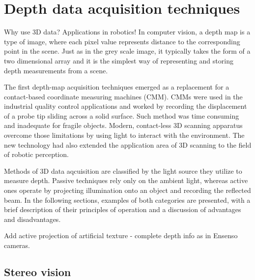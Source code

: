 \chapter{Depth data acquisition techniques}
\label{cha:acquisition}

Why use 3D data? Applications in robotics!
In computer vision, a depth map is a type of image, where each pixel value represents distance to the corresponding point in the scene. Just as in the grey scale image, it typically takes the form of a two dimensional array and it is the simplest way of representing and storing depth measurements from a scene.

The first depth-map acquisition techniques emerged as a replacement for a contact-based coordinate measuring machines (CMM). CMMs were used in the industrial quality control applications and worked by recording the displacement of a probe tip sliding across a solid surface. Such method was time consuming and inadequate for fragile objects. Modern, contact-less 3D scanning apparatus overcome those limitations by using light to interact with the environment. The new technology had also extended the application area of 3D scanning to the field of robotic perception.

Methods of 3D data aqcuisition are classified by the light source they utilize to measure depth. Passive techniques rely only on the ambient light, whereas active ones operate by projecting illumination onto an object and recording the reflected beam. In the following sections, examples of both categories are presented, with a brief description of their principles of operation and a discussion of advantages and disadvantages.

Add active projection of artificial texture - complete depth info as in Ensenso cameras.


\section{Stereo vision}
\label{sec:stereo}


